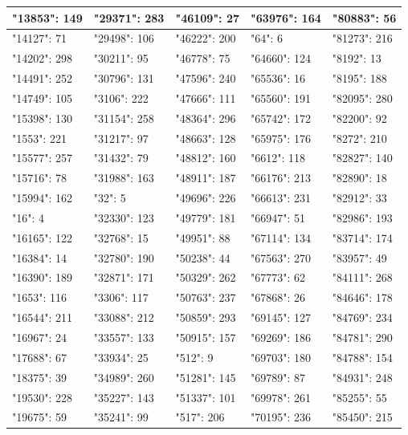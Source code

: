\documentclass[11pt,letterpaper]{article}
\begin{document}
\begin{enumerate}[label=\alph*)]
\begin{itemize}
\begin{table}[H]
\begin{longtable}{|l|l|l|l|l|}
"13853": 149  & "29371": 283   &  "46109": 27   & "63976": 164  & "80883": 56  \\ \hline
"14127": 71   & "29498": 106   &  "46222": 200  & "64": 6       & "81273": 216 \\ \hline
"14202": 298  & "30211": 95    &  "46778": 75   & "64660": 124  & "8192": 13   \\ \hline
"14491": 252  & "30796": 131   &  "47596": 240  & "65536": 16   & "8195": 188  \\ \hline
"14749": 105  & "3106": 222    &  "47666": 111  & "65560": 191  & "82095": 280 \\ \hline
"15398": 130  & "31154": 258   &  "48364": 296  & "65742": 172  & "82200": 92  \\ \hline
"1553": 221   & "31217": 97    &  "48663": 128  & "65975": 176  & "8272": 210  \\ \hline
"15577": 257  & "31432": 79    &  "48812": 160  & "6612": 118   & "82827": 140 \\ \hline
"15716": 78   & "31988": 163   &  "48911": 187  & "66176": 213  & "82890": 18  \\ \hline
"15994": 162  & "32": 5        &  "49696": 226  & "66613": 231  & "82912": 33  \\ \hline
"16": 4       & "32330": 123   &  "49779": 181  & "66947": 51   & "82986": 193 \\ \hline
"16165": 122  & "32768": 15    &  "49951": 88   & "67114": 134  & "83714": 174 \\ \hline
"16384": 14   & "32780": 190   &  "50238": 44   & "67563": 270  & "83957": 49  \\ \hline
"16390": 189  & "32871": 171   &  "50329": 262  & "67773": 62   & "84111": 268 \\ \hline
"1653": 116   & "3306": 117    &  "50763": 237  & "67868": 26   & "84646": 178 \\ \hline
"16544": 211  & "33088": 212   &  "50859": 293  & "69145": 127  & "84769": 234 \\ \hline
"16967": 24   & "33557": 133   &  "50915": 157  & "69269": 186  & "84781": 290 \\ \hline
"17688": 67   & "33934": 25    &  "512": 9      & "69703": 180  & "84788": 154 \\ \hline
"18375": 39   & "34989": 260   &  "51281": 145  & "69789": 87   & "84931": 248 \\ \hline
"19530": 228  & "35227": 143   &  "51337": 101  & "69978": 261  & "85255": 55  \\ \hline
"19675": 59   & "35241": 99    &  "517": 206    & "70195": 236  & "85450": 215 \\ \hline

\end{longtable}
\end{table}
\end{itemize}
\end{enumerate}
\end{document}
